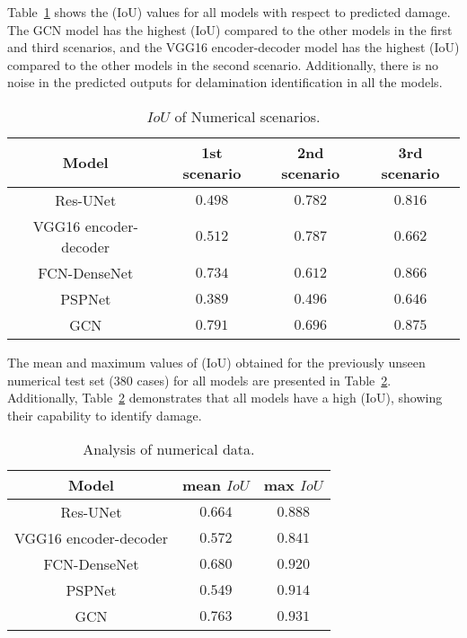 Table~\ref{tab:table_numerical_scenarios} shows the (IoU) values for all models with respect to predicted damage.
The GCN model has the highest (IoU) compared to the other models in the first and third scenarios, and the VGG16 encoder-decoder model has the highest (IoU) compared to the other models in the second scenario.
Additionally, there is no noise in the predicted outputs for delamination identification in all the models.
\begin{table}[]
	\centering
	\caption{\(IoU\) of Numerical scenarios.}
	\label{tab:table_numerical_scenarios}
	\resizebox{\textwidth}{!}
	{
		\begin{tabular}{cccc}\hline
			Model & 1st scenario & 2nd scenario & 3rd scenario \\ \hline
			Res-UNet & \(0.498\) & \(0.782\) & \(0.816\) \\ 
			VGG16 encoder-decoder & \(0.512\) & \(0.787\) & \(0.662\) \\
			FCN-DenseNet & \(0.734\) & \(0.612\) & \(0.866\) \\ 
			PSPNet & \(0.389\) & \(0.496\) & \(0.646\) \\ 
			GCN & \(0.791\) & \(0.696\) & \(0.875\) \\ \hline
		\end{tabular}
	}
\end{table}

The mean and maximum values of (IoU) obtained for the previously unseen numerical test set (380 cases) for all models are presented in Table~\ref{tab:table_iou}.
Additionally, Table~\ref{tab:table_iou} demonstrates that all models have a high (IoU), showing their capability to identify damage.
\begin{table}[]
	\centering
	\caption{Analysis of numerical data.}
	\label{tab:table_iou}
	\begin{tabular}{ccc}\hline
		Model & mean \(IoU\) & max \(IoU\) \\ \hline
		Res-UNet & \(0.664\) & \(0.888\) \\ 
		VGG16 encoder-decoder & \(0.572\) & \(0.841\) \\ 
		FCN-DenseNet & \(0.680\) & \(0.920\) \\ 
		PSPNet & \(0.549\) & \(0.914\) \\ 
		GCN & \(0.763\) & \(0.931\) \\ \hline
	\end{tabular}
\end{table}

